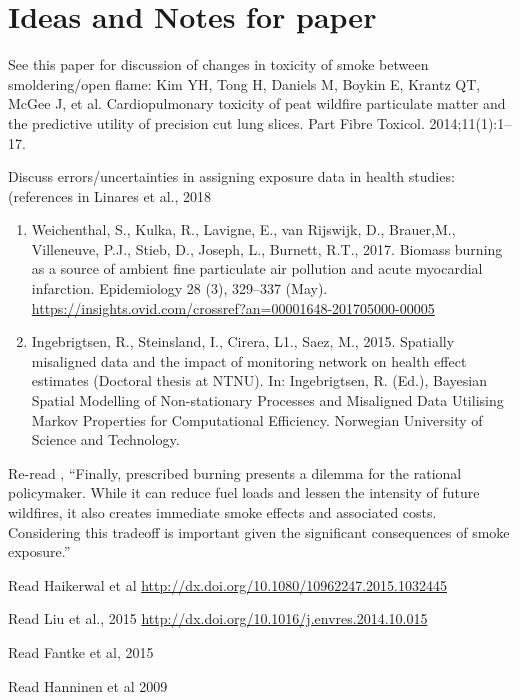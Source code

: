 \section{Ideas and Notes for paper}

See this paper for discussion of changes in toxicity of smoke between smoldering/open flame: Kim YH, Tong H, Daniels M, Boykin E, Krantz QT, McGee J, et al.
Cardiopulmonary toxicity of peat wildfire particulate matter and the predictive
utility of precision cut lung slices. Part Fibre Toxicol. 2014;11(1):1–17.

Discuss errors/uncertainties in assigning exposure data in health studies: (references in Linares et al., 2018 \cite{linares_impact_2018}
\begin{enumerate}
\item Weichenthal, S., Kulka, R., Lavigne, E., van Rijswijk, D., Brauer,M., Villeneuve, P.J., Stieb, D.,
Joseph, L., Burnett, R.T., 2017. Biomass burning as a source of ambient fine particulate
air pollution and acute myocardial infarction. Epidemiology 28 (3), 329–337 (May). \url{https://insights.ovid.com/crossref?an=00001648-201705000-00005}

\item Ingebrigtsen, R., Steinsland, I., Cirera, L1., Saez, M., 2015. Spatially misaligned data and the
impact of monitoring network on health effect estimates (Doctoral thesis at NTNU).
In: Ingebrigtsen, R. (Ed.), Bayesian Spatial Modelling of Non-stationary Processes
and Misaligned Data Utilising Markov Properties for Computational Efficiency. Norwegian
University of Science and Technology. 
\end{enumerate}

Re-read \cite{jones_application_2017}, ``Finally, prescribed burning presents a dilemma for the rational policymaker. While it can reduce fuel loads and lessen the intensity of future wildfires, it also creates immediate smoke effects and associated costs. Considering this tradeoff is important given the significant consequences of smoke exposure.''

Read Haikerwal et al \url{http://dx.doi.org/10.1080/10962247.2015.1032445}

Read Liu et al., 2015 \url{http://dx.doi.org/10.1016/j.envres.2014.10.015}

Read Fantke et al, 2015 \cite{http://dx.doi.org/10.1007/s11367-014-0822-2}

Read Hanninen et al 2009 \cite{http://dx.doi.org/10.1038/jes.2008.31}

